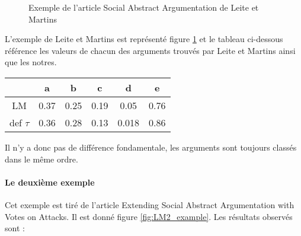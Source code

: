 \documentclass[12pt]{article}
\theoremstyle{defi}
\theoremstyle{not}
\theoremstyle{prob}
\begin{document}
          \begin{figure}
            \centering
            \caption{Exemple de l'article Social Abstract Argumentation de Leite et Martins}
            \label{fig:LM_example}
          \end{figure}

          L'exemple de Leite et Martins est représenté figure \ref{fig:LM_example} et le tableau ci-dessous référence les valeurs de chacun des arguments trouvés par Leite et Martins ainsi que les notres.

          \begin{tabular}{|c|c|c|c|c|c|}
            \hline
                       & a    & b    & c    & d     & e \\
            \hline
            LM         & 0.37 & 0.25 & 0.19 & 0.05  & 0.76 \\
            \hline
            def $\tau$ & 0.36 & 0.28 & 0.13 & 0.018 & 0.86\\
            \hline
          \end{tabular}

          Il n'y a donc pas de différence fondamentale, les arguments sont toujours classés dans le même ordre.

        \paragraph{Le deuxième exemple\\}
          Cet exemple est tiré de l'article Extending Social Abstract Argumentation with Votes on Attacks.
          Il est donné figure \ref{fig:LM2_example}. Les résultats observés sont :
\end{document}
